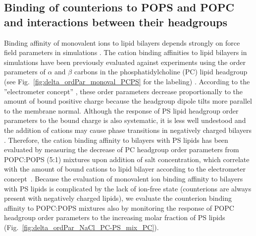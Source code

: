 \documentclass[journal=jctcce,manuscript=article]{achemso}
\begin{document}
\subsection{Binding of counterions to POPS and POPC and interactions between their headgroups}
Binding affinity of monovalent ions to lipid bilayers depends strongly on
force field parameters in simulations \cite{catte16,NMRlipidsIV}.
The cation binding affinities to lipid bilayers in simulations have been previously evaluated
against experiments using the order parameters of $\alpha$ and $\beta$ carbons in the
phosphatidylcholine (PC) lipid headgroup (see Fig.~\ref{fig:delta_ordPar_monoval_PCPS} for the labeling) \cite{catte16,melcr18,NMRlipidsIV}.
According to the ''electrometer concept'' \citep{seelig87}, these order parameters
decrease proportionally to the amount of bound positive charge because the headgroup dipole tilts more
parallel to the membrane normal.
Although the response of PS lipid headgroup order parameters to the bound charge is also systematic,
it is less well undestood and the addition of cations may cause phase transitions in negatively charged
bilayers \cite{feigenson86,mattai89,roux91,roux90}.
Therefore, the cation binding affinity to bilayers with PS lipids has been evaluated by measuring the decrease
of PC headgroup order parameters from POPC:POPS (5:1) mixtures upon addition of salt concentration,
which correlate with the amount of bound cations to lipid bilayer according to the
electrometer concept~\cite{akutsu81,altenbach84,seelig87,roux90,catte16,NMRlipidsIV}.
Because the evaluation of monovalent ion binding affinity to bilayers with
PS lipids is complicated by the lack of ion-free state (counterions are always present with negatively charged lipids),
we evaluate the counterion binding affinity to POPC:POPS mixtures also by monitoring
the response of POPC headgroup order parameters to the increasing molar fraction of PS lipids~\cite{NMRlipidsIV} 
(Fig.~\ref{fig:delta_ordPar_NaCl_PC-PS_mix_PC}).
\end{document}
